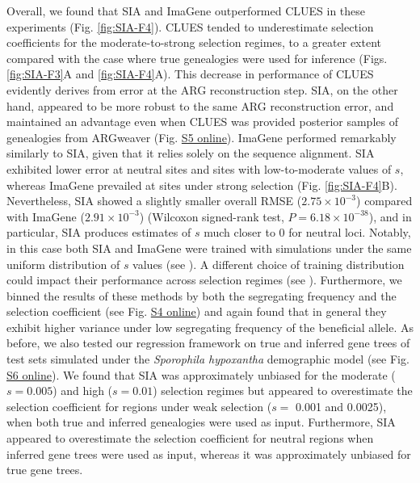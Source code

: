 Overall, we found that \ac{SIA} and ImaGene outperformed CLUES in these experiments (Fig. \ref{fig:SIA-F4}). CLUES tended to underestimate selection coefficients for the moderate-to-strong selection regimes, to a greater extent compared with the case where true genealogies were used for inference (Figs. \ref{fig:SIA-F3}A and \ref{fig:SIA-F4}A). This decrease in performance of CLUES evidently derives from error at the \ac{ARG} reconstruction step. \ac{SIA}, on the other hand, appeared to be more robust to the same \ac{ARG} reconstruction error, and maintained an advantage even when CLUES was provided posterior samples of genealogies from ARGweaver (Fig. \href{https://academic.oup.com/mbe/article/39/1/msab332/6433161#supplementary-data}{S5 online}). ImaGene performed remarkably similarly to \ac{SIA}, given that it relies solely on the sequence alignment. \ac{SIA} exhibited lower error at neutral sites and sites with low-to-moderate values of $s$, whereas ImaGene prevailed at sites under strong selection (Fig. \ref{fig:SIA-F4}B). Nevertheless, \ac{SIA} showed a slightly smaller overall \ac{RMSE} ($2.75\times 10^{-3}$) compared with ImaGene ($2.91\times 10^{-3}$) (Wilcoxon signed-rank test, $P = 6.18\times 10^{-38}$), and in particular, \ac{SIA} produces estimates of $s$ much closer to 0 for neutral loci. Notably, in this case both \ac{SIA} and ImaGene were trained with simulations under the same uniform distribution of $s$ values (see ). A different choice of training distribution could impact their performance across selection regimes (see ). Furthermore, we binned the results of these methods by both the segregating frequency and the selection coefficient (see Fig. \href{https://academic.oup.com/mbe/article/39/1/msab332/6433161#supplementary-data}{S4 online}) and again found that in general they exhibit higher variance under low segregating frequency of the beneficial allele. As before, we also tested our regression framework on true and inferred gene trees of test sets simulated under the \textit{Sporophila hypoxantha} demographic model (see Fig. \href{https://academic.oup.com/mbe/article/39/1/msab332/6433161#supplementary-data}{S6 online}). We found that \ac{SIA} was approximately unbiased for the moderate ($s=0.005$) and high ($s=0.01$) selection regimes but appeared to overestimate the selection coefficient for regions under weak selection ($s=$ 0.001 and 0.0025), when both true and inferred genealogies were used as input. Furthermore, \ac{SIA} appeared to overestimate the selection coefficient for neutral regions when inferred gene trees were used as input, whereas it was approximately unbiased for true gene trees.

